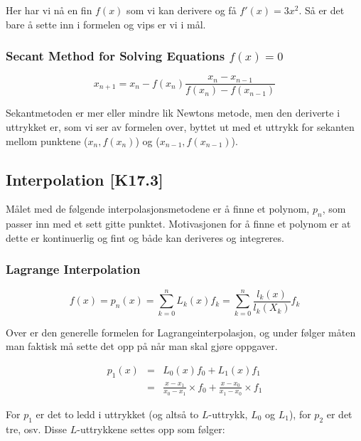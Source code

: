 \documentclass[norsk, a4paper, 12pt, titlepage]{article}
\begin{document}
Her har vi nå en fin $f(x)$ som vi kan derivere og få $f'(x) =
3x^{2}$. Så er det bare å sette inn i formelen og vips er vi i mål.

\subsubsection{Secant Method for Solving Equations $f(x) = 0$}
\begin{equation}
x_{n+1} = x_{n} - f(x_{n}) \frac{x_{n} - x_{n-1}}{f(x_{n}) -
f(x_{n-1})}
\end{equation}

Sekantmetoden er mer eller mindre lik Newtons metode, men den
deriverte i uttrykket er, som vi ser av formelen over, byttet ut med
et uttrykk for sekanten mellom punktene ($x_{n}, f(x_{n})$) og
($x_{n-1}, f(x_{n-1})$).


\subsection{Interpolation [K17.3]}
Målet med de følgende interpolasjonsmetodene er å finne et polynom,
$p_{n}$, som passer inn med et sett gitte punktet.  Motivasjonen for å
finne et polynom er at dette er kontinuerlig og fint og både kan
deriveres og integreres.

\subsubsection{Lagrange Interpolation}

\begin{equation}
f(x) = p_{n}(x) = \sum_{k=0}^{n}L_{k}(x)f_{k} =
\sum_{k=0}^{n}\frac{l_{k}(x)}{l_{k}(X_{k})}f_{k}
\end{equation}

Over er den generelle formelen for Lagrangeinterpolasjon, og under
følger måten man faktisk må sette det opp på når man skal gjøre
oppgaver.

\begin{eqnarray*}
p_{1}(x) & = & L_{0}(x)f_{0} + L_{1}(x)f_{1} \\
& = & \frac{x - x_{1}}{x_{0} - x_{1}} \times f_{0} + \frac{x -
x_{0}}{x_{1} - x_{0}} \times f_{1}
\end{eqnarray*}

For $p_{1}$ er det to ledd i uttrykket (og altså to $L$-uttrykk,
$L_{0}$ og $L_{1}$), for $p_{2}$ er det tre, osv.  Disse
$L$-uttrykkene settes opp som følger:
\end{document}

